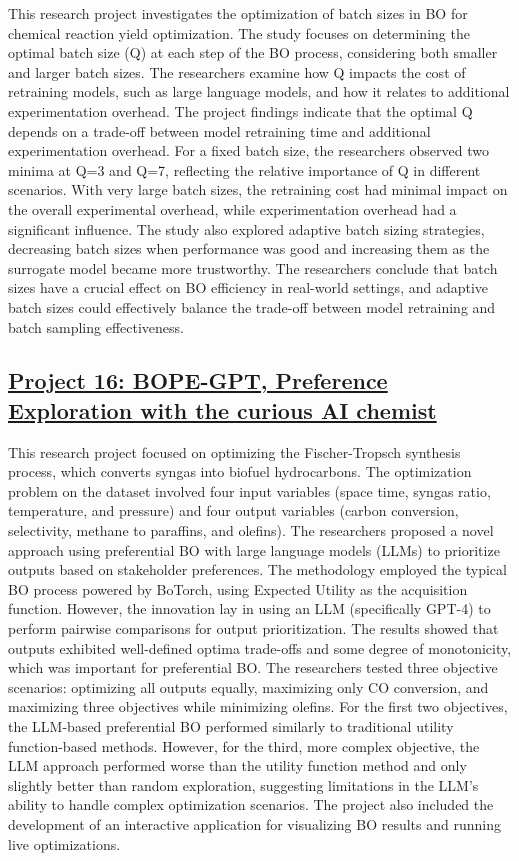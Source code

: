 This research project investigates the optimization of batch sizes in BO for chemical reaction yield optimization. The study focuses on determining the optimal batch size (Q) at each step of the BO process, considering both smaller and larger batch sizes. The researchers examine how Q impacts the cost of retraining models, such as large language models, and how it relates to additional experimentation overhead. The project findings indicate that the optimal Q depends on a trade-off between model retraining time and additional experimentation overhead. For a fixed batch size, the researchers observed two minima at Q=3 and Q=7, reflecting the relative importance of Q in different scenarios. With very large batch sizes, the retraining cost had minimal impact on the overall experimental overhead, while experimentation overhead had a significant influence. The study also explored adaptive batch sizing strategies, decreasing batch sizes when performance was good and increasing them as the surrogate model became more trustworthy. The researchers conclude that batch sizes have a crucial effect on BO efficiency in real-world settings, and adaptive batch sizes could effectively balance the trade-off between model retraining and batch sampling effectiveness.
 \subsection*{\href{https://www.youtube.com/watch?v=AbRDOdmafB8}{Project 16: BOPE-GPT, Preference Exploration with the curious AI chemist}}

This research project focused on optimizing the Fischer-Tropsch synthesis process\cite{mahmoudi2017review}, which converts syngas into biofuel hydrocarbons. The optimization problem on the dataset\cite{lozano2008single,chakkingal2022multi} involved four input variables (space time, syngas ratio, temperature, and pressure) and four output variables (carbon conversion, selectivity, methane to paraffins, and olefins). The researchers proposed a novel approach using preferential BO\cite{lin2022preference} with large language models (LLMs) to prioritize outputs based on stakeholder preferences. The methodology employed the typical BO process powered by BoTorch, using Expected Utility as the acquisition function. However, the innovation lay in using an LLM (specifically GPT-4) to perform pairwise comparisons for output prioritization. The results showed that outputs exhibited well-defined optima trade-offs and some degree of monotonicity, which was important for preferential BO. The researchers tested three objective scenarios: optimizing all outputs equally, maximizing only CO conversion, and maximizing three objectives while minimizing olefins. For the first two objectives, the LLM-based preferential BO performed similarly to traditional utility function-based methods. However, for the third, more complex objective, the LLM approach performed worse than the utility function method and only slightly better than random exploration, suggesting limitations in the LLM's ability to handle complex optimization scenarios. The project also included the development of an interactive application for visualizing BO results and running live optimizations.
